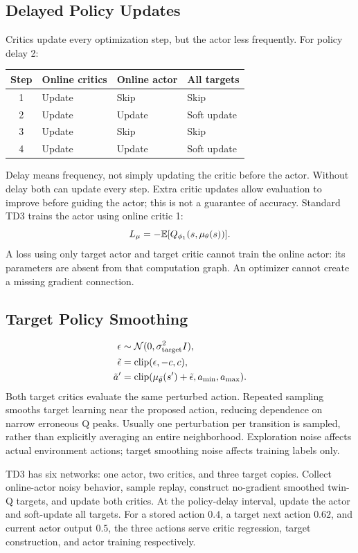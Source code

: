 \subsection{Delayed Policy Updates}
Critics update every optimization step, but the actor less frequently.
For policy delay 2:
\begin{center}
\begin{tabular}{c l l l}
\toprule Step & Online critics & Online actor & All targets\\
\midrule
1 & Update & Skip & Skip\\
2 & Update & Update & Soft update\\
3 & Update & Skip & Skip\\
4 & Update & Update & Soft update\\
\bottomrule
\end{tabular}
\end{center}
Delay means frequency, not simply updating the critic before the actor.
Without delay both can update every step.
Extra critic updates allow evaluation to improve before guiding
the actor; this is not a guarantee of accuracy.
Standard TD3 trains the actor using online critic 1:
\begin{equation}
L_\mu=-\mathbb{E}[Q_{\phi_1}(s,\mu_\theta(s))].
\end{equation}
A loss using only target actor and target critic cannot train the
online actor: its parameters are absent from that computation graph.
An optimizer cannot create a missing gradient connection.

\subsection{Target Policy Smoothing}
\begin{align}
\epsilon&\sim\mathcal N(0,\sigma_{\rm target}^2I),\\
\tilde\epsilon&=\operatorname{clip}(\epsilon,-c,c),\\
\tilde a'&=\operatorname{clip}(
\mu_{\bar\theta}(s')+\tilde\epsilon,a_{\min},a_{\max}).
\end{align}
Both target critics evaluate the same perturbed action.
Repeated sampling smooths target learning near the proposed action,
reducing dependence on narrow erroneous Q peaks. Usually one
perturbation per transition is sampled, rather than explicitly
averaging an entire neighborhood.
Exploration noise affects actual environment actions;
target smoothing noise affects training labels only.

TD3 has six networks: one actor, two critics, and three target copies.
Collect online-actor noisy behavior, sample replay, construct
no-gradient smoothed twin-Q targets, and update both critics.
At the policy-delay interval, update the actor and soft-update all targets.
For a stored action $0.4$, a target next action $0.62$, and current actor
output $0.5$, the three actions serve critic regression, target
construction, and actor training respectively.

